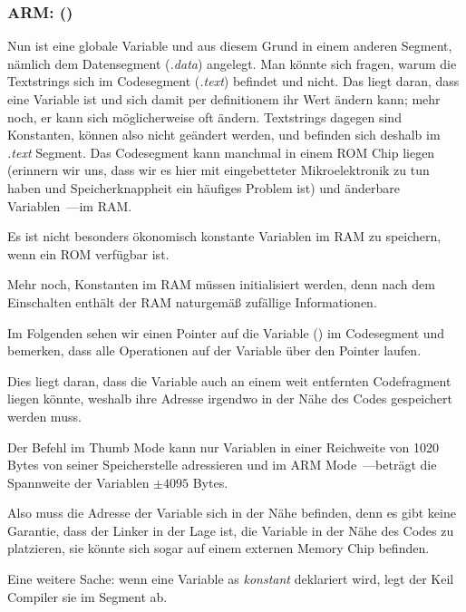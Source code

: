 \subsubsection{ARM: \OptimizingKeilVI (\ThumbMode)}


Nun ist  eine globale Variable und aus diesem Grund in einem anderen Segment, nämlich dem Datensegment
(\emph{.data}) angelegt. Man könnte sich fragen, warum die Textstrings sich im Codesegment (\emph{.text}) befindet und
 nicht. Das liegt daran, dass  eine Variable ist und sich damit per definitionem ihr Wert ändern kann; mehr
noch, er kann sich möglicherweise oft ändern. Textstrings dagegen sind Konstanten, können also nicht geändert werden,
und befinden sich deshalb im \emph{.text} Segment.
\myindex{\RAM}
\myindex{\ROM}
Das Codesegment kann manchmal in einem \ac{ROM} Chip liegen (erinnern wir uns, dass wir es hier mit eingebetteter
Mikroelektronik zu tun haben und Speicherknappheit ein häufiges Problem ist) und änderbare Variablen~---im \ac{RAM}.

Es ist nicht besonders ökonomisch konstante Variablen im RAM zu speichern, wenn ein ROM verfügbar ist.

Mehr noch, Konstanten im RAM müssen initialisiert werden, denn nach dem Einschalten enthält der RAM naturgemäß zufällige
Informationen.

Im Folgenden sehen wir einen Pointer auf die Variable  () im Codesegment und bemerken, dass alle
Operationen auf der Variable über den Pointer laufen.

Dies liegt daran, dass die Variable  auch an einem weit entfernten Codefragment liegen könnte, weshalb ihre
Adresse irgendwo in der Nähe des Codes gespeichert werden muss.

Der Befehl  im Thumb Mode kann nur Variablen in einer Reichweite von 1020 Bytes von seiner Speicherstelle
adressieren und im ARM Mode~---beträgt die Spannweite der Variablen $\pm{}4095$ Bytes.

Also muss die Adresse der Variable  sich in der Nähe befinden, denn es gibt keine Garantie, dass der Linker in der
Lage ist, die Variable in der Nähe des Codes zu platzieren, sie könnte sich sogar auf einem externen Memory Chip
befinden.

\myindex{\ROM}
Eine weitere Sache: wenn eine Variable as \emph{konstant} deklariert wird, legt der Keil Compiler sie im 
Segment ab.


